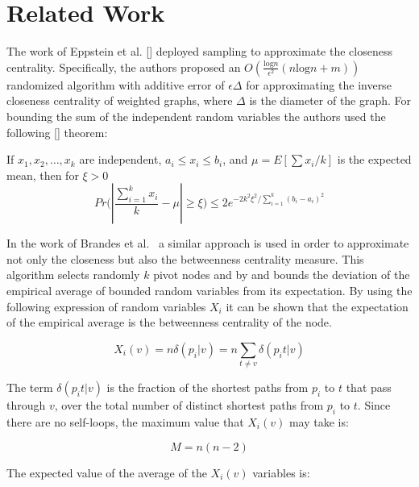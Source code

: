 \section{Related Work}\label{sec:prevwork}

The work of Eppstein et al. [] deployed sampling to approximate the closeness centrality.
Specifically, the authors proposed an $O(\frac{\mbox{log}n}{\epsilon^2}(n\mbox{log}n+m))$ randomized algorithm with additive error of $\epsilon \Delta$ for approximating the inverse closeness centrality of weighted graphs, where $\Delta$ is the diameter of the graph.
For bounding the sum of the independent random variables the authors used the following [] theorem:

\begin{theorem}
\cite{} If $x_{1},x_{2},\ldots,x_{k}$ are independent, $a_{i}\leq x_{i}\leq b_{i}$, and $\mu=E[\sum x_{i}/k]$ is the expected mean, then for $\xi > 0$
\begin{displaymath}
Pr\Big( |\frac{\sum_{i=1}^{k}x_{i}}{k}-\mu|\geq \xi\Big)\leq 2e^{-2k^2\xi^2/\sum_{i=1}^{k}(b_{i}-a_{i})^2}
\end{displaymath}
\end{theorem}

In the work of Brandes et al.~\cite{brandes2007centrality} a similar approach is used in order to approximate not only the closeness but also the betweenness centrality measure.
This algorithm selects randomly $k$ pivot nodes and by and bounds the deviation of the empirical average of bounded random variables from its expectation.
By using the following expression of random variables $X_{i}$ it can be shown that the expectation of the empirical average is the betweenness centrality of the node.

\begin{displaymath}
X_{i}(v)=n\delta (p_{i}|v)=n\sum_{t\neq v}\delta (p_{i}t|v)
\end{displaymath}

The term $\delta (p_{i}t|v)$ is the fraction of the shortest paths from $p_{i}$ to $t$ that pass through $v$, over the total number of distinct shortest paths from 
$p_{i}$ to $t$.
Since there are no self-loops, the maximum value that $X_{i}(v)$ may take is:

\begin{displaymath}
M=n(n-2)
\end{displaymath}

The expected value of the average of the $X_{i}(v)$ variables is:

